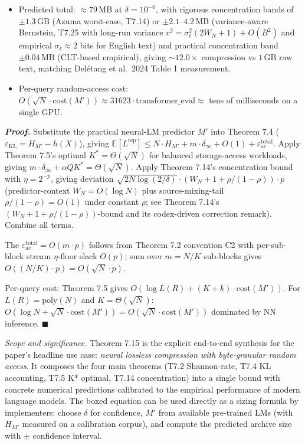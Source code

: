 \documentclass[
]{article}
\begin{document}
\begin{itemize}
of archive). This is the
practical sizing estimate, well below the Azuma worst-case bound.
\item Predicted total: $\approx 79\,\mathrm{MB}$ at $\delta = 10^{-6}$,
with rigorous concentration bands of $\pm 1.3\,\mathrm{GB}$
(Azuma worst-case, T7.14) or $\pm 2.1$--$4.2\,\mathrm{MB}$
(variance-aware Bernstein, T7.25 with long-run variance
$v^2 = \sigma_\ell^2 (2W_N+1) + O(B^2)$ and
empirical $\sigma_\ell \approx 2$ bits for English text) and
practical concentration band $\pm 0.04\,\mathrm{MB}$ (CLT-based
empirical), giving $\sim 12.0\times$ compression vs $1\,\mathrm{GB}$
raw text, matching Del{\'e}tang et al.\ 2024 Table 1 measurement.
\item Per-query random-access cost: $O(\sqrt{N} \cdot \mathrm{cost}(M'))
\approx 31623 \cdot \mathrm{transformer\_eval} \approx$ tens of
milliseconds on a single GPU.
\end{itemize}

\emph{\textbf{Proof.}} Substitute the practical neural-LM predictor
$M'$ into Theorem 7.4 ($\varepsilon_{\mathrm{KL}} = H_{M'} - h(X)$),
giving $\mathbb{E}[L^{\mathrm{rep}}] \leq N \cdot H_{M'} + m \cdot
\delta_\infty + O(1) + \varepsilon_{\mathrm{ac}}^{\mathrm{total}}$.
Apply Theorem 7.5's optimal $K^* = \Theta(\sqrt{N})$ for balanced
storage-access workloads, giving $m \cdot \delta_\infty + \alpha Q
K^* = \Theta(\sqrt{N})$. Apply Theorem 7.14's concentration bound
with $\eta = 2^{-p}$, giving deviation
$\sqrt{2 N \log(2/\delta)} \cdot (W_N + 1 + \rho/(1-\rho)) \cdot p$
(predictor-context $W_N = O(\log N)$ plus source-mixing-tail
$\rho/(1-\rho) = O(1)$ under constant $\rho$; see Theorem 7.14's
$(W_N + 1 + \rho/(1-\rho))$-bound and its codex-driven correction
remark). Combine all terms.

The $\varepsilon_{\mathrm{ac}}^{\mathrm{total}} = O(m \cdot p)$
follows from Theorem 7.2 convention C2 with per-sub-block stream
$\eta$-floor slack $O(p)$; sum over $m = N/K$ sub-blocks gives
$O((N/K) \cdot p) = O(\sqrt{N} \cdot p)$.

Per-query cost: Theorem 7.5 gives
$O(\log L(R) + (K + k) \cdot \mathrm{cost}(M'))$. For
$L(R) = \mathrm{poly}(N)$ and $K = \Theta(\sqrt{N})$:
$O(\log N + \sqrt{N} \cdot \mathrm{cost}(M')) = O(\sqrt{N} \cdot
\mathrm{cost}(M'))$ dominated by NN inference.
\hfill$\blacksquare$

\emph{Scope and significance.} Theorem 7.15 is the explicit end-to-end
synthesis for the paper's headline use case: \emph{neural lossless
compression with byte-granular random access}. It composes the four
main theorems (T7.2 Shannon-rate, T7.4 KL accounting, T7.5 K* optimal,
T7.14 concentration) into a single bound with concrete numerical
predictions calibrated to the empirical performance of modern
language models. The boxed equation can be used directly as a sizing
formula by implementers: choose $\delta$ for confidence,
$M'$ from available pre-trained LMs (with $H_{M'}$ measured on a
calibration corpus), and compute the predicted archive size with
$\pm$ confidence interval.
\end{document}
